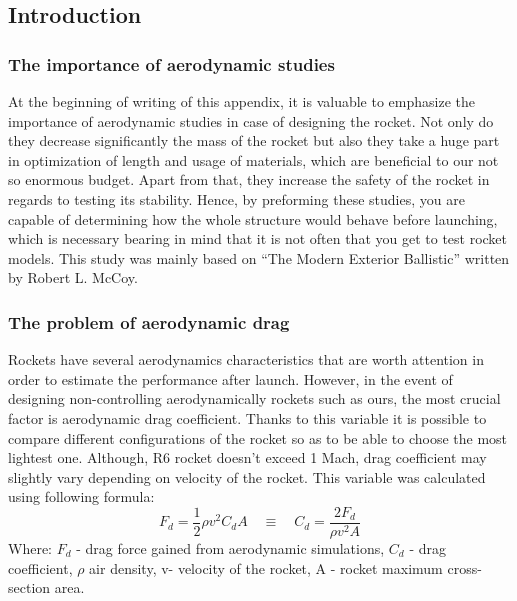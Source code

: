 \subsection{Introduction}
\subsubsection{The importance of aerodynamic studies}
At the beginning of writing of this appendix, it is valuable to emphasize the importance of 
aerodynamic studies in case of designing the rocket.  Not only do they decrease significantly 
the mass of the rocket but also they take a huge part in optimization of length and usage of 
materials, which are beneficial to our not so enormous budget. Apart from that, they increase 
the safety of the rocket in regards to testing its stability. Hence, by preforming these studies, 
you are capable of determining how the whole structure would behave before launching, which is 
necessary bearing in mind that it is not often that you get to test rocket models. This study 
was mainly based on “The Modern Exterior Ballistic” written by Robert L. McCoy.

\subsubsection{The problem of aerodynamic drag}
Rockets have several aerodynamics characteristics that are worth attention in order to 
estimate the performance after launch. However, in the event of designing non-controlling 
aerodynamically rockets such as ours, the most crucial factor is aerodynamic drag coefficient. 
Thanks to this variable it is possible to compare different configurations of the rocket so as to be able 
to choose the most lightest one. Although, R6 rocket doesn't exceed 1 Mach, drag coefficient 
may slightly vary depending on velocity of the rocket. This variable was calculated 
using following formula:
\begin{equation}
    F_d = \frac{1}{2} \rho v^2 C_d A \quad \equiv \quad C_d = \frac{2F_d}{\rho v^2 A}
\end{equation}
Where: $F_d$ - drag force gained from aerodynamic simulations, $C_d$ - drag coefficient, 
$\rho$ air density, v- velocity of the rocket, A - rocket maximum cross-section area.\\\\




